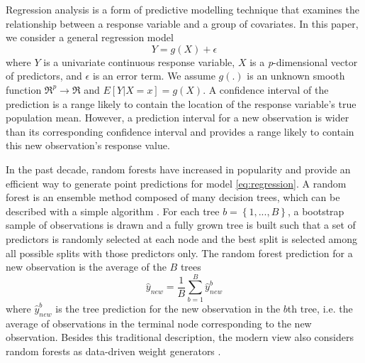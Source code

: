 Regression analysis is a form of predictive modelling technique that examines the relationship between a response variable and a group of covariates. In this paper, we consider a general regression model
\begin{equation} \label{eq:regression}
Y = g\left(X\right)+\epsilon
\end{equation}
where $Y$ is a univariate continuous response variable, $X$ is a \emph{p}-dimensional vector of predictors, and $\epsilon$ is an error term. We assume $g\left(.\right)$ is an unknown smooth function $\Re^p \rightarrow \Re$ and $E\left[Y|X=x\right] = g\left(X\right)$. A confidence interval of the prediction is a range likely to contain the location of the response variable's true population mean. However, a prediction interval for a new observation is wider than its corresponding confidence interval and provides a range likely to contain this new observation's response value.

In the past decade, random forests have increased in popularity and provide an efficient way to generate point predictions for model \eqref{eq:regression}. A random forest is an ensemble method composed of many decision trees, which can be described with a simple algorithm \citep{breiman_random_2001}. For each tree $b=\left \{1,..., B\right \}$, a bootstrap sample of observations is drawn and a fully grown tree is built such that a set of predictors is randomly selected at each node and the best split is selected among all possible splits with those predictors only. The random forest prediction for a new observation is the average of the $B$ trees
\begin{equation*}
    \hat{y}^{}_{new} = \frac{1}{B} \sum_{b=1}^{B}\hat{y}^b_{new}
\end{equation*}
where $\hat{y}^b_{new}$ is the tree prediction for the new observation in the $b$th tree, i.e. the average of observations in the terminal node corresponding to the new observation. Besides this traditional description, the modern view also considers random forests as data-driven weight generators  \citep{hothorn_bagging_2004,lin_random_2006,moradian_l1_2017,moradian_survival_2019,athey_generalized_2019,roy_prediction_2020,tabib_non-parametric_2020,alakus_conditional_2021}. 


